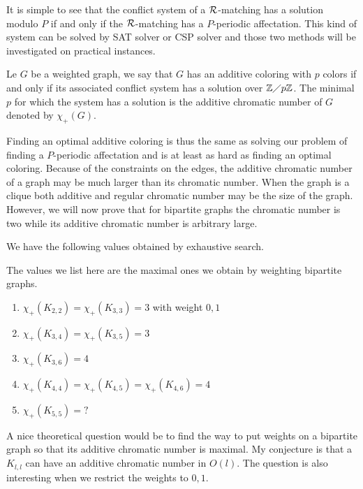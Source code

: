 \documentclass{article}
\newcommand\rmatching{$\cal R$-matching\xspace}
\begin{document}
{It is simple to see that the conflict system of a \rmatching has a solution modulo $P$ if and only if 
the \rmatching has a $P$-periodic affectation. This kind of system can be solved by SAT solver or CSP solver and those two methods will be investigated on practical instances.

\begin{definition}
 Le $G$ be a weighted graph, we say that $G$ has an additive coloring with $p$ colors if and only if its associated
 conflict system has a solution over $\mathbb{Z} \diagup p\mathbb{Z}$. The minimal $p$ for which the system has a solution is the additive chromatic number of $G$ denoted by $\chi_{+}(G)$.
\end{definition}

Finding an optimal additive coloring is thus the same as solving our problem of finding a $P$-periodic affectation
and is at least as hard as finding an optimal coloring.  Because of the constraints on the edges, 
the additive chromatic number of a graph may be much larger than its chromatic number.
When the graph is a clique both additive and regular chromatic number may be the size of the graph.
However, we will now prove that for bipartite graphs the chromatic number is two while its additive 
chromatic number is arbitrary large.

We have the following values obtained by exhaustive search.

\begin{fact}
 The values we list here are the maximal ones we obtain 
 by weighting bipartite graphs.
 \begin{enumerate}
  \item  $\chi_{+}(K_{2,2})= \chi_{+}(K_{3,3}) = 3$ with weight $0,1$
  \item $\chi_{+}(K_{3,4}) = \chi_{+}(K_{3,5}) =3$ 
  \item $\chi_{+}(K_{3,6}) = 4$ 
  \item  $\chi_{+}(K_{4,4})=\chi_{+}(K_{4,5})=\chi_{+}(K_{4,6})=4$
  \item $\chi_{+}(K_{5,5})= ?$
 \end{enumerate}
 \end{fact}

 A nice theoretical question would be to find the way to put weights
 on a bipartite graph so that its additive chromatic number is maximal. 
 My conjecture is that a $K_{l,l}$ can have an additive chromatic number in $O(l)$.
 The question is also interesting when we restrict the weights to $0,1$.
 
}
\end{document}
